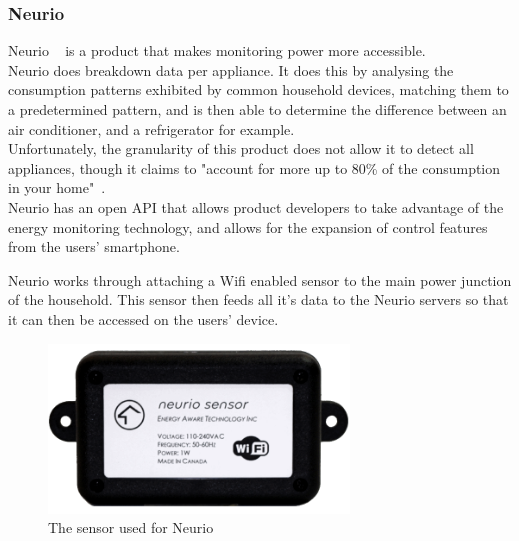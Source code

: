 \documentclass[preprint,12pt,3p]{elsarticle}
\begin{document}
\subsubsection{Neurio}

Neurio ~\cite{neurio} is a product that makes monitoring power more accessible.\\ 
Neurio does breakdown data per appliance. It does this by analysing the consumption patterns exhibited by common household devices, matching them to a predetermined pattern, and is then able to determine the difference between an air conditioner, and a refrigerator for example. \\
Unfortunately, the granularity of this product does not allow it to detect all appliances, though it claims to "account for more up to 80\% of the consumption in your home"~\cite{neurio-detection}.\\ Neurio has an open API that allows product developers to take advantage of the energy monitoring technology, and allows for the expansion of control features from the users' smartphone.

Neurio works through attaching a Wifi enabled sensor to the main power junction of the household. This sensor then feeds all it's data to the Neurio servers so that it can then be accessed on the users' device.
\begin{figure}[h]
    \centering
    \includegraphics[width=8cm]{existing/neurio-sensor}
    \caption {The sensor used for Neurio}
\end{figure}
\end{document}
